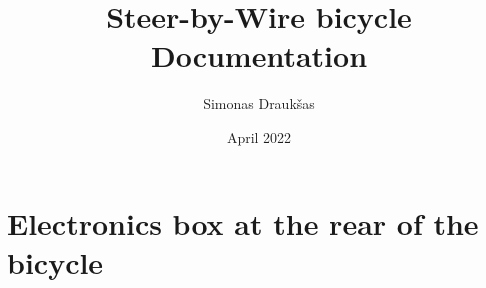 \documentclass[12pt,a4paper]{report}
\title{Steer-by-Wire bicycle \\ Documentation}
\author{Simonas Draukšas}
\date{April 2022}
\begin{document}
\maketitle

\tableofcontents

\chapter{Electronics box at the rear of the bicycle}

\end{document}
